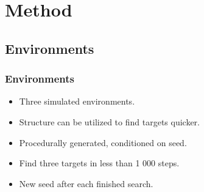 \section{Method}

\subsection{Environments}

\begin{frame}
    \frametitle{Environments}
    
    \begin{itemize}
        \item Three simulated environments.
        \item Structure can be utilized to find targets quicker.
        \item Procedurally generated, conditioned on seed.
        \item Find three targets in less than 1 000 steps.
        \item New seed after each finished search.
    \end{itemize}
\end{frame}


